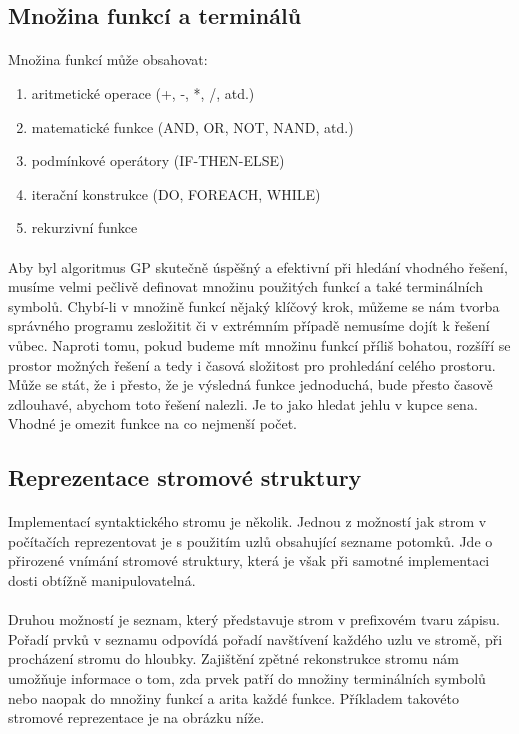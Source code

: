 \documentclass[bc,male,java,dept460]{diploma}		%
\begin{document}
\subsection{Množina funkcí a terminálů}
\paragraph*{}
Množina funkcí může obsahovat:
\begin{enumerate}
\item aritmetické operace (+, -, *, /, atd.)
\item matematické funkce (AND, OR, NOT, NAND, atd.)
\item podmínkové operátory (IF-THEN-ELSE)
\item iterační konstrukce (DO, FOREACH, WHILE)
\item rekurzivní funkce
\end{enumerate}

\paragraph*{}
Aby byl algoritmus GP skutečně úspěšný a efektivní při hledání vhodného řešení, musíme velmi pečlivě definovat množinu použitých funkcí a také terminálních symbolů. Chybí-li v množině funkcí nějaký klíčový krok, můžeme se nám tvorba správného programu zesložitit či v extrémním případě nemusíme dojít k řešení vůbec. Naproti tomu, pokud budeme mít množinu funkcí příliš bohatou, rozšíří se prostor možných řešení a tedy i časová složitost pro prohledání celého prostoru. Může se stát, že i přesto, že je výsledná funkce jednoduchá, bude přesto časově zdlouhavé, abychom toto řešení nalezli. Je to jako hledat jehlu v kupce sena. Vhodné je omezit funkce na co nejmenší počet.

\subsection{Reprezentace stromové struktury}
\paragraph*{}
Implementací syntaktického stromu je několik. Jednou z možností jak strom v počítačích reprezentovat je s použitím uzlů obsahující sezname potomků. Jde o přirozené vnímání stromové struktury, která je však při samotné implementaci dosti obtížně manipulovatelná. 

\paragraph*{}
Druhou možností je seznam, který představuje strom v prefixovém tvaru zápisu. Pořadí prvků v seznamu odpovídá pořadí navštívení každého uzlu ve stromě, při procházení stromu do hloubky. Zajištění zpětné rekonstrukce stromu nám umožňuje informace o tom, zda prvek patří do množiny terminálních symbolů nebo naopak do množiny funkcí a arita každé funkce. Příkladem takovéto stromové reprezentace je na obrázku níže.
\end{document}
